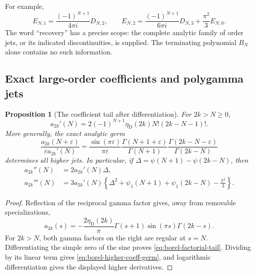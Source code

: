 \documentclass[11pt,a4paper]{article}
\numberwithin{equation}{section}
\newtheorem{proposition}[theorem]{Proposition}
\theoremstyle{definition}
\theoremstyle{remark}
\begin{document}
For example,
\[
 E_{N,1}=\frac{(-1)^{N+1}}{4\pi i}D_{N,2},\qquad
 E_{N,2}=\frac{(-1)^{N+1}}{6\pi i}D_{N,3}
          +\frac{\pi^2}{3}E_{N,0}.
\]
The word ``recovery'' has a precise scope: the complete analytic family
of order jets, or its indicated discontinuities, is supplied. The
terminating polynomial $B_N$ alone contains no such information.

\subsection{Exact large-order coefficients and polygamma jets}

\begin{proposition}[The coefficient tail after differentiation]
\label{prop:borel-factorial-tail}
For $2k>N\geq0$,
\begin{equation}\label{eq:borel-factorial-tail}
 \boxed{\quad a_{2k}'(N)
   =2(-1)^{N+1}\eta_{\mathrm D}(2k)N!(2k-N-1)!.\quad}
\end{equation}
More generally, the exact analytic germ
\begin{equation}\label{eq:borel-higher-coeff-germ}
 \frac{a_{2k}(N+\varepsilon)}{\varepsilon a_{2k}'(N)}
 =\frac{\sin(\pi\varepsilon)}{\pi\varepsilon}
  \frac{\Gamma(N+1+\varepsilon)}{\Gamma(N+1)}
  \frac{\Gamma(2k-N-\varepsilon)}{\Gamma(2k-N)}
\end{equation}
determines all higher jets. In particular, if
$\Delta=\psi(N+1)-\psi(2k-N)$, then
\begin{align}
 a_{2k}''(N)&=2a_{2k}'(N)\Delta,\label{eq:borel-coeff-second}\\
 a_{2k}'''(N)&=3a_{2k}'(N)
 \left\{\Delta^2+\psi_1(N+1)+\psi_1(2k-N)-\frac{\pi^2}{3}\right\}.
 \label{eq:borel-coeff-third}
\end{align}
\end{proposition}

\begin{proof}
Reflection of the reciprocal gamma factor gives, away from removable
specializations,
\[
 a_{2k}(s)=-\frac{2\eta_{\mathrm D}(2k)}{\pi}
 \Gamma(s+1)\sin(\pi s)\Gamma(2k-s).
\]
For $2k>N$, both gamma factors on the right are regular at $s=N$.
Differentiating the simple zero of the sine proves
\eqref{eq:borel-factorial-tail}. Dividing by its linear term gives
\eqref{eq:borel-higher-coeff-germ}, and logarithmic differentiation gives
the displayed higher derivatives.
\end{proof}
\end{document}

